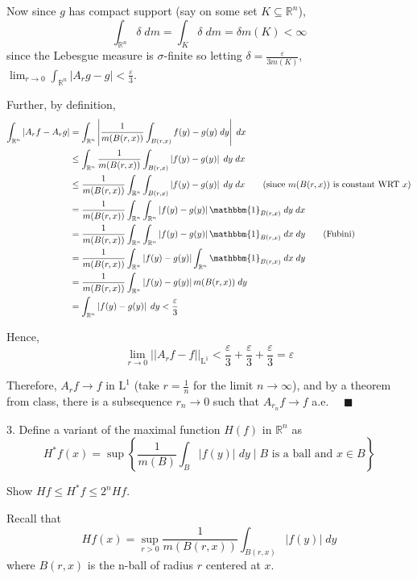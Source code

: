 \documentclass[12pt]{article}
\newcommand{\R}{\mathbb{R}}
\newcommand{\ind}{\mathbbm{1}}
\newcommand{\qed}{\quad \blacksquare}
\newcommand{\abs}[1]{\left\vert #1 \right\vert}
\newcommand{\norm}[1]{\left\vert\left\vert #1 \right\vert\right\vert}
\newcommand{\ep}{\varepsilon}
\renewcommand{\L}{\text{L}}
\newcommand{\sub}{\subseteq}
\begin{document}
        Now since $g$ has compact support (say on some set $K \sub \R^n$), 
        \[\int_{\R^n} \delta \; dm = \int_{K} \delta \; dm = \delta m(K) < \infty\]
        since the Lebesgue measure is $\sigma$-finite so letting $\delta = \frac{\ep}{3m(K)}$, $\lim_{r \to 0} \int_{\R^n} \abs{A_r g - g} < \frac{\ep}{3}$.

        Further, by definition,
        \begin{align*}
            \int_{\R^n} \abs{A_r f - A_r g} &= \int_{\R^n}\abs{\frac{1}{m(B(r, x))} \int_{B(r, x)} f(y) - g(y)\; dy}\; dx\\
                &\leq \int_{\R^n}\frac{1}{m(B(r, x))} \int_{B(r, x)} \abs{f(y) - g(y)}\; dy\;dx\\ 
                &\leq \frac{1}{m(B(r, x))} \int_{\R^n} \int_{B(r, x)} \abs{f(y) - g(y)}\; dy\; dx \qquad (\text{since }m(B(r, x)) \text{ is constant WRT } x)\\
                &= \frac{1}{m(B(r, x))} \int_{\R^n} \int_{\R^n} \abs{f(y) - g(y)} \ind_{B(r, x)}\; dy\; dx\\
                &= \frac{1}{m(B(r, x))} \int_{\R^n} \int_{\R^n} \abs{f(y) - g(y)} \ind_{B(r, x)}\; dx\; dy \qquad (\text{Fubini})\\
                &= \frac{1}{m(B(r, x))} \int_{\R^n} \abs{f(y) - g(y)} \int_{\R^n} \ind_{B(r, x)}\; dx\; dy\\
                &= \frac{1}{m(B(r, x))} \int_{\R^n} \abs{f(y) - g(y)} m(B(r, x))\; dy\\
                &= \int_{\R^n} \abs{f(y) - g(y)}\; dy < \frac{\ep}{3}
        \end{align*}

        Hence, 
        \[\lim_{r \to 0} \norm{A_r f - f}_{\L^1} < \frac{\ep}{3} + \frac{\ep}{3} + \frac{\ep}{3} = \ep\]

        Therefore, $A_r f \to f$ in $\L^1$ (take $r = \frac{1}{n}$ for the limit $n \to \infty$), and by a theorem from class, there is a subsequence $r_n \to 0$ such that $A_{r_n} f \to f$ a.e. $\qed$
        
    
    \color{black}


\pagebreak 

3. Define a variant of the maximal function $H(f)$ in $\R^n$ as 
\[H^* f(x) = \sup \left\{\frac{1}{m(B)} \int_B \abs{f(y)}\; dy \; \bigg\vert \; B \text{ is a ball and } x \in B\right\}\]

Show $Hf \leq H^* f \leq 2^n Hf$. 

    \color{blue}
        Recall that 
        \[H f(x) = \sup_{r > 0} \frac{1}{m(B(r, x))} \int_{B(r, x)} \abs{f(y)}\; dy\]
        where $B(r, x)$ is the n-ball of radius $r$ centered at $x$.
\end{document}
